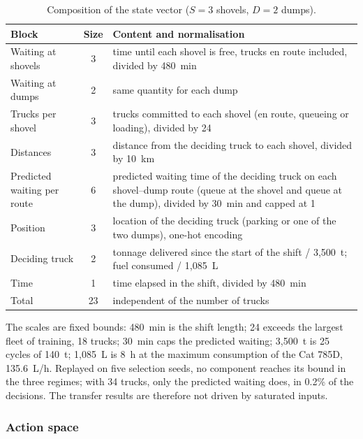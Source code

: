 \documentclass[11pt,a4paper]{article}
\newif\ifrevmarks
\newcommand{\revtag}[1]{\ifrevmarks\textsuperscript{\textcolor{red!70!black}{\scriptsize[#1]}}\fi}
\newcommand{\rev}[2]{\ifrevmarks{\color{revcolor}#2}\revtag{#1}\else#2\fi}
\newif\ifcorrmarks
\newcommand{\corr}[1]{\ifcorrmarks\textcolor{corrcolor}{#1}\else#1\fi}
\begin{document}
\begin{table}[H]
\centering
\caption{\rev{M1, N1, N2, v3}{Composition of the state vector ($S = 3$ shovels, $D = 2$ dumps).}}
\label{tab:state}
\footnotesize
\begin{tabularx}{\textwidth}{lcX}
\toprule
\textbf{Block} & \textbf{Size} & \textbf{Content and normalisation} \\
\midrule
Waiting at shovels & 3 & time until each shovel is free, trucks en route included, divided by 480~min \\
Waiting at dumps & 2 & same quantity for each dump \\
Trucks per shovel & 3 & trucks committed to each shovel (en route, queueing or loading), divided by 24 \\
Distances & 3 & distance from the deciding truck to each shovel, divided by 10~km \\
Predicted waiting per route & 6 & predicted waiting time of the deciding truck on each shovel--dump route (queue at the shovel and queue at the dump), divided by 30~min and capped at 1 \\
Position & 3 & location of the deciding truck (parking or one of the two dumps), one-hot encoding \\
Deciding truck & 2 & tonnage delivered since the start of the shift / 3{,}500~t; fuel consumed / 1{,}085~L \\
Time & 1 & time elapsed in the shift, divided by 480~min \\
\midrule
Total & 23 & independent of the number of trucks \\
\bottomrule
\end{tabularx}
\end{table}

\corr{The scales are fixed bounds: 480~min is the shift length; 24 exceeds the largest fleet of training, 18 trucks; 30~min caps the predicted waiting; 3{,}500~t is 25 cycles of 140~t; 1{,}085~L is 8~h at the maximum consumption of the Cat 785D, 135.6~L/h. Replayed on five selection seeds, no component reaches its bound in the three regimes; with 34 trucks, only the predicted waiting does, in 0.2\% of the decisions. The transfer results are therefore not driven by saturated inputs.}


\subsubsection{Action space}
\end{document}

